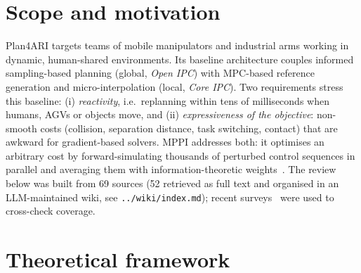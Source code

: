 \ifsotafull
\section{Scope and motivation}
Plan4ARI targets teams of mobile manipulators and industrial arms working in dynamic, human-shared environments. Its baseline architecture couples informed sampling-based planning (global, \emph{Open IPC}) with MPC-based reference generation and micro-interpolation (local, \emph{Core IPC}). Two requirements stress this baseline: (i) \emph{reactivity}, i.e.\ replanning within tens of milliseconds when humans, AGVs or objects move, and (ii) \emph{expressiveness of the objective}: non-smooth costs (collision, separation distance, task switching, contact) that are awkward for gradient-based solvers. MPPI addresses both: it optimises an arbitrary cost by forward-simulating thousands of perturbed control sequences in parallel and averaging them with information-theoretic weights~\cite{williams2017jgcd,williams2018tro}. The review below was built from 69 sources (52 retrieved as full text and organised in an LLM-maintained wiki, see \texttt{../wiki/index.md}); recent surveys~\cite{kazim2024survey} were used to cross-check coverage.

\fi
\section{Theoretical framework}
